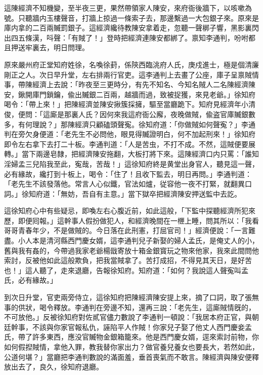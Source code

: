 這陳經濟不知機變，至半夜三更，果然帶領家人陳安，來府衙後牆下，以咳嗽為號。只聽牆内玉樓聲音，打牆上掠過一條索子去，那邊繫過一大包銀子來。原來是庫内拿的二百兩贓罰銀子。這經濟纔待教陳安拿着走，忽聽一聲梆子響，黑影裏閃出四五條漢，呌聲：「有賊了！」登時把經濟連陳安都綁了。禀知李通判，吩咐都且押送牢裏去，明日問理。

原來嚴州府正堂知府姓徐，名喚徐葑，係陝西臨洮府人氏，庚戍進士，極是個清廉剛正之人。次日早升堂，左右排兩行官吏。這李通判上去畫了公座，庫子呈禀賊情事，帶陳經濟上去說：「昨夜至三更時分，有先不知名、今知名賊人二名陳經濟陳安，鍬開庫門鎖鑰，偸出贓銀二百兩，越牆而過，致被捉獲，來見老爺。」徐知府喝令：「帶上來！」把陳經濟並陳安揪簇採擁，驅至當廳跪下。知府見經濟年小清俊，便問：「這廝是那裏人氏？因何來我這府衙公廨，夜晚做賊，偸盗官庫贓銀數多，有何理說？」那陳經濟只顧磕頭聲寃。徐知府道：「你做賊如何聲寃？」李通判在旁欠身便道：「老先生不必問他，眼見得贓證明白，何不加起刑來！」徐知府即令左右拿下去打二十板。李通判道：「人是苦虫，不打不成。不然，這賊便要展轉。」當下兩邊皂隸，把經濟陳安拖翻，大板打將下來。這陳經濟口内只罵：「誰知淫婦孟三兒陷我至此，寃哉，苦哉！」這徐知府終是黄堂出身官人，聽見這一聲，必有緣故，纔打到十板上，喝令：「住了！且收下監去，明日再問。」李通判道：「老先生不該發落他。常言人心似鐵，官法如爐，従容他一夜不打緊，就翻異口詞。」徐知府道：「無妨，吾自有主意。」當下獄卒把經濟陳安押送監中去訖。

這徐知府心中有些疑忌，即喚左右心腹近前，如此這般，「下監中探聽經濟所犯來歷，即便囘報。」這幹事人假扮做犯人，和經濟晚間在一㭱上睡，問其所以：「我看哥哥青春年少，不是做賊的。今日落在此刑憲，打屈官司！」經濟便說：「一言難盡。小人本是清河縣西門慶女婿，這李通判兒子新娶的婦人孟氏，是俺丈人的小，舊與我有姦的，今帶過我家老爺楊戩寄放十箱金銀寳玩之物來他家，我來此間問他索討，反被他如此這般欺負，把我當賊拿了。苦打成招，不得見其天日，是好苦也！」這人聽了，走來退廳，告報徐知府。知府道：「如何？我說這人聲寃叫孟氏，必有緣故。」

到次日升堂，官吏兩旁侍立，這徐知府把陳經濟陳安提上來，摘了口詞，取了張無事的供狀，喝令釋放。李通判在旁邊不知，還再三說：「老先生，這廝賊情旣的，不可放他。」反被徐知府對佐貳官儘力數說了李通判一頓說：「我居本府正官，與朝廷幹事，不該與你家官報私仇，誣陷平人作賊！你家兒子娶了他丈人西門慶妾孟氏，帶了許多東西，應没官贓物金銀箱籠來。他是西門慶女婿，逕來索討前物，你如何假揑賊情，拿他入罪，教我替你家出力？做官養兒養女也要長大，若然如此，公道何堪？」當廳把李通判數說的滿面羞，垂首喪氣而不敢言。陳經濟與陳安便釋放出去了，良久，徐知府退廳。

